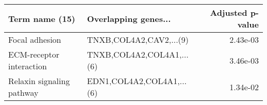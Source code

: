\begin{tabular}{llr}
\toprule
           Term name (15) &      Overlapping genes... &  Adjusted p-value \\
\midrule
           Focal adhesion &   TNXB,COL4A2,CAV2,...(9) &          2.43e-03 \\
 ECM-receptor interaction & TNXB,COL4A2,COL4A1,...(6) &          3.46e-03 \\
Relaxin signaling pathway & EDN1,COL4A2,COL4A1,...(6) &          1.34e-02 \\
\bottomrule
\end{tabular}
